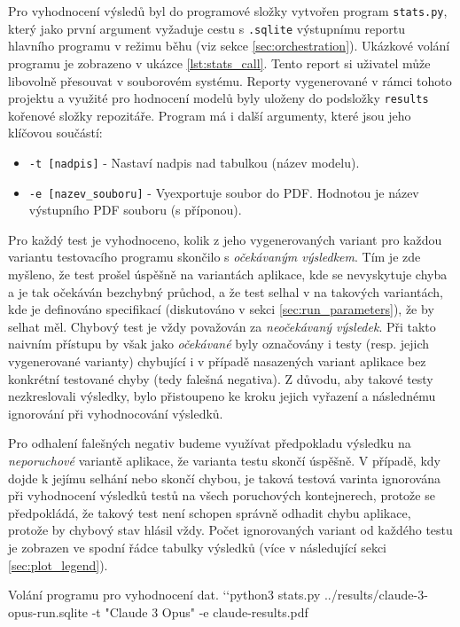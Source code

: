 \documentclass[czech, ma, kiv, he, iso690numb, pdf, viewonly]{fasthesis}
\begin{document}
        Pro vyhodnocení výsledů byl do programové složky vytvořen program \verb|stats.py|, který jako první argument vyžaduje cestu s \verb|.sqlite| výstupnímu reportu hlavního programu v režimu běhu (viz sekce \ref{sec:orchestration}). Ukázkové volání programu je zobrazeno v ukázce \ref{lst:stats_call}. Tento report si uživatel může libovolně přesouvat v souborovém systému. Reporty vygenerované v rámci tohoto projektu a využité pro hodnocení modelů byly uloženy do podsložky \verb|results| kořenové složky repozitáře. Program má i další argumenty, které jsou jeho klíčovou součástí:
        \begin{itemize}
            \item \verb|-t [nadpis]| - Nastaví nadpis nad tabulkou (název modelu).
            \item \verb|-e [nazev_souboru]| - Vyexportuje soubor do PDF. Hodnotou je název výstupního PDF souboru (s příponou).
        \end{itemize}
        Pro každý test je vyhodnoceno, kolik z jeho vygenerovaných variant pro každou variantu testovacího programu skončilo s \textit{očekávaným výsledkem}. Tím je zde myšleno, že test prošel úspěšně na variantách aplikace, kde se nevyskytuje chyba a je tak očekáván bezchybný průchod, a že test selhal v na takových variantách, kde je definováno specifikací (diskutováno v sekci \ref{sec:run_parameters}), že by selhat měl. Chybový test je vždy považován za \textit{neočekávaný výsledek}. Při takto naivním přístupu by však jako \emph{očekávané} byly označovány i testy (resp. jejich vygenerované varianty) chybující i v případě nasazených variant aplikace bez konkrétní testované chyby (tedy falešná negativa). Z důvodu, aby takové testy nezkreslovali výsledky, bylo přistoupeno ke kroku jejich vyřazení a následnému ignorování při vyhodnocování výsledků.

        Pro odhalení falešných negativ budeme využívat předpokladu výsledku na \emph{neporuchové} variantě aplikace, že varianta testu skončí úspěšně. V případě, kdy dojde k jejímu selhání nebo skončí chybou, je taková testová varinta ignorována při vyhodnocení výsledků testů na všech poruchových kontejnerech, protože se předpokládá, že takový test není schopen správně odhadit chybu aplikace, protože by chybový stav hlásil vždy. Počet ignorovaných variant od každého testu je zobrazen ve spodní řádce tabulky výsledků (více v následující sekci \ref{sec:plot_legend}).

        \begin{console}{Volání programu pro vyhodnocení dat. \label{lst:stats_call}}
`\uxprompt`python3 stats.py ../results/claude-3-opus-run.sqlite -t "Claude 3 Opus" -e claude-results.pdf
        \end{console}
\end{document}
